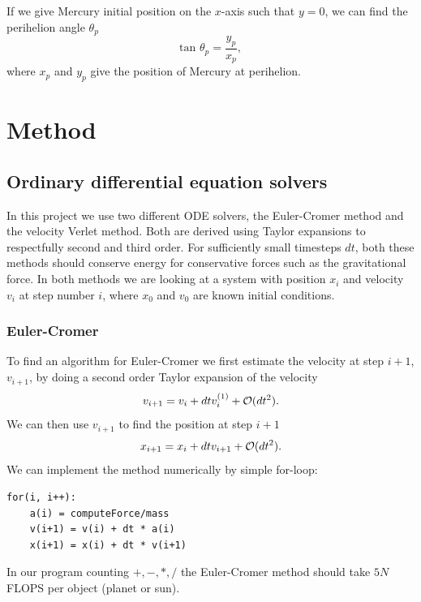 \documentclass[norsk,a4paper,12pt]{article}
\begin{document}
{If we give Mercury initial position on the $x$-axis such that $y=0$, we can find the perihelion angle $\theta_p$
\begin{equation}
\text{tan }\theta_p = \frac{y_p}{x_p},
\label{eq:perihelionangle}
\end{equation}
where $x_p$ and $y_p$ give the position of Mercury at perihelion.
\section{Method}
\subsection{Ordinary differential equation solvers}
In this project we use two different ODE solvers, the Euler-Cromer method and the velocity Verlet method. Both are derived using Taylor expansions to respectfully second and third order. For sufficiently small timesteps $dt$, both these methods should conserve energy for conservative forces such as the gravitational force. In both methods we are looking at a system with position $x_i$ and velocity $v_i$ at step number $i$, where $x_0$ and $v_0$ are known initial conditions.
\subsubsection{Euler-Cromer}
To find an algorithm for Euler-Cromer we first estimate the velocity at step $i+1$, $v_{i+1}$, by doing a second order Taylor expansion of the velocity 
\begin{equation}
v_{i+1} = v_i + dtv_i^{(1)} + {\cal O}(dt^2). 
\label{eq:EulCrov}
\end{equation}
We can then use $v_{i+1}$ to find the position at step $i+1$
\begin{equation}
x_{i+1} = x_i + dtv_{i+1} + {\cal O}(dt^2).
\label{eq:EulCrox}
\end{equation}
We can implement the method numerically by simple for-loop:
\begin{lstlisting}
for(i, i++):
	a(i) = computeForce/mass
	v(i+1) = v(i) + dt * a(i)
	x(i+1) = x(i) + dt * v(i+1)
\end{lstlisting}
In our program counting $+,-,*,/$ the Euler-Cromer method should take $5N$ FLOPS per object (planet or sun).
}
\end{document}

